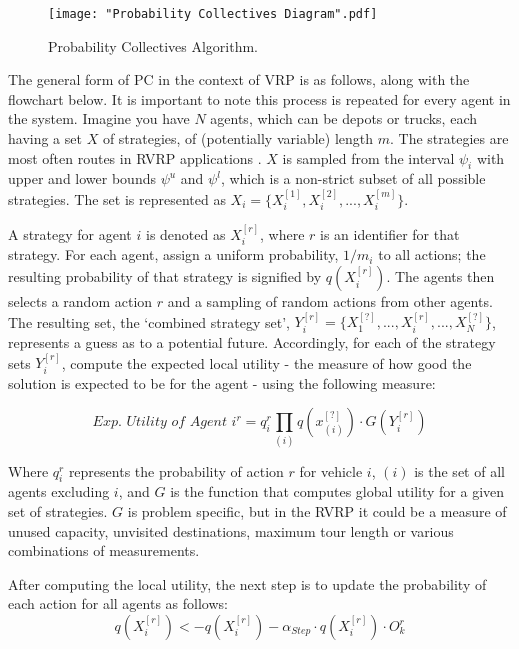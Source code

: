 \documentclass{sig-alternate}
\begin{document}
\begin{figure}[h]
\centering
\texttt{[image: "Probability Collectives Diagram".pdf]}
\caption{Probability Collectives Algorithm.}
\label{fig:PCDiagram}
\end{figure}

The general form of PC in the context of VRP is as follows, along with the flowchart below. It is important to note this process is repeated for every agent in the system. Imagine you have $N$ agents, which can be depots or trucks, each having a set $X$ of strategies, of (potentially variable) length $m$. The strategies are most often routes in RVRP applications \cite{Vasirani:2008}. $X$ is sampled from the interval $\psi_i$ with upper and lower bounds $\psi^u$ and $\psi^l$, which is a non-strict subset of all possible strategies. The set is represented as $X_i=\{X_i^{[1]}, X_i^{[2]}, ..., X_i^{[m]}\}$. 

A strategy for agent $i$ is denoted as $X_i^{[r]}$, where $r$ is an identifier for that strategy. For each agent, assign a uniform probability, $1/m_i$ to all actions; the resulting probability of that strategy is signified by $q(X_i^{[r]})$. The agents then selects a random action $r$ and a sampling of random actions from other agents. The resulting set, the `combined strategy set', $Y_i^{[r]}=\{X_1^{[?]}, ...,X_i^{[r]}, ...,X_N^{[?]}\}$, represents a guess as to a potential future. Accordingly, for each of the strategy sets $Y_i^{[r]}$, compute the expected local utility - the measure of how good the solution is expected to be for the agent - using the following measure:

	\begin{equation}
	\textit{Exp. Utility of Agent } i^r =q_i^r\prod_{(i)}{q(x_{(i)}^{[?]})\cdot G(Y_i^{[r]})}
	\end{equation}
	
Where $q_i^r$ represents the probability of action $r$ for vehicle $i$, $(i)$ is the set of all agents excluding $i$, and $G$ is the function that computes global utility for a given set of strategies. $G$ is problem specific, but in the RVRP it could be a measure of unused capacity, unvisited destinations, maximum tour length or various combinations of measurements.

After computing the local utility, the next step is to update the probability of each action for all agents as follows:
	\begin{equation}
	q(X_i^{[r]})<-q(X_i^{[r]})-\alpha_{Step}\cdot q(X_i^{[r]})\cdot O_k^r
	\end{equation}
	
\end{document}
